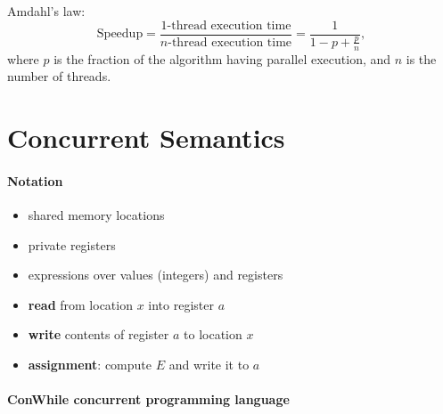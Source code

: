 \documentclass[twocolumn,landscape,10pt]{article}
\theoremstyle{definition}
\begin{document}
Amdahl's law:
\[
    \text{Speedup} = \frac{\text{1-thread execution time}}
    {n\text{-thread execution time}}
    = \frac{1}{1-p+\frac{p}{n}},
\]
where $p$ is the fraction of the algorithm having parallel execution, and $n$ is
the number of threads.

\clearpage
\section{Concurrent Semantics}

\paragraph{Notation}

\begin{itemize}
    \item{} shared memory locations
    \item{} private registers
    \item{} expressions over values
                (integers) and registers
    \item{} \textbf{read} from location $x$ into
            register $a$
    \item{} \textbf{write} contents of register $a$ to
            location $x$
    \item{} \textbf{assignment}: compute $E$ and write
            it to $a$
\end{itemize} 

\paragraph{ConWhile concurrent programming language}
\end{document}
